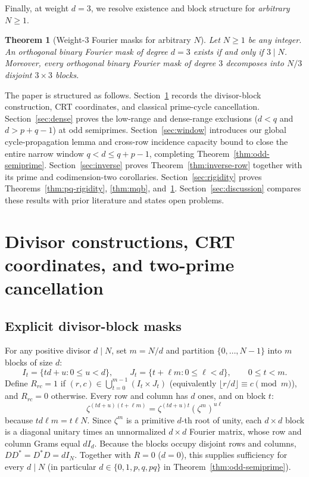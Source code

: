 \documentclass[11pt,reqno]{amsart}
\numberwithin{equation}{section}
\newtheorem{theorem}{Theorem}[section]
\theoremstyle{definition}
\theoremstyle{remark}
\begin{document}
Finally, at weight $d=3$, we resolve existence and block structure for \emph{arbitrary} $N\ge 1$.

\begin{theorem}[Weight-$3$ Fourier masks for arbitrary $N$]
\label{thm:weight3}
Let $N\ge 1$ be any integer. An orthogonal binary Fourier mask of degree $d=3$ exists if and only if $3\mid N$. Moreover, every orthogonal binary Fourier mask of degree $3$ decomposes into $N/3$ disjoint $3\times 3$ blocks.
\end{theorem}

The paper is structured as follows. Section~\ref{sec:prelim} records the divisor-block construction, CRT coordinates, and classical prime-cycle cancellation. Section~\ref{sec:dense} proves the low-range and dense-range exclusions ($d<q$ and $d>p+q-1$) at odd semiprimes. Section~\ref{sec:window} introduces our global cycle-propagation lemma and cross-row incidence capacity bound to close the entire narrow window $q<d\le q+p-1$, completing Theorem~\ref{thm:odd-semiprime}. Section~\ref{sec:inverse} proves Theorem~\ref{thm:inverse-row} together with its prime and codimension-two corollaries. Section~\ref{sec:rigidity} proves Theorems~\ref{thm:pq-rigidity}, \ref{thm:mqb}, and~\ref{thm:weight3}. Section~\ref{sec:discussion} compares these results with prior literature and states open problems.

\section{Divisor constructions, CRT coordinates, and two-prime cancellation}
\label{sec:prelim}

\subsection{Explicit divisor-block masks}
For any positive divisor $d\mid N$, set $m=N/d$ and partition $\{0,\ldots,N-1\}$ into $m$ blocks of size $d$:
\begin{equation}
\label{eq:divisor-blocks}
I_t = \{td+u : 0\le u<d\},\qquad
J_t = \{t+\ell m : 0\le \ell<d\},\qquad 0\le t<m.
\end{equation}
Define $R_{rc}=1$ if $(r,c)\in \bigcup_{t=0}^{m-1} (I_t\times J_t)$ (equivalently $\lfloor r/d\rfloor \equiv c\pmod m$), and $R_{rc}=0$ otherwise. Every row and column has $d$ ones, and on block $t$:
\[
\zeta^{(td+u)(t+\ell m)} = \zeta^{(td+u)t}(\zeta^m)^{u\ell}
\]
because $td\ell m = t\ell N$. Since $\zeta^m$ is a primitive $d$-th root of unity, each $d\times d$ block is a diagonal unitary times an unnormalized $d\times d$ Fourier matrix, whose row and column Grams equal $dI_d$. Because the blocks occupy disjoint rows and columns, $DD^*=D^*D=dI_N$. Together with $R=0$ ($d=0$), this supplies sufficiency for every $d\mid N$ (in particular $d\in\{0,1,p,q,pq\}$ in Theorem~\ref{thm:odd-semiprime}).
\end{document}
